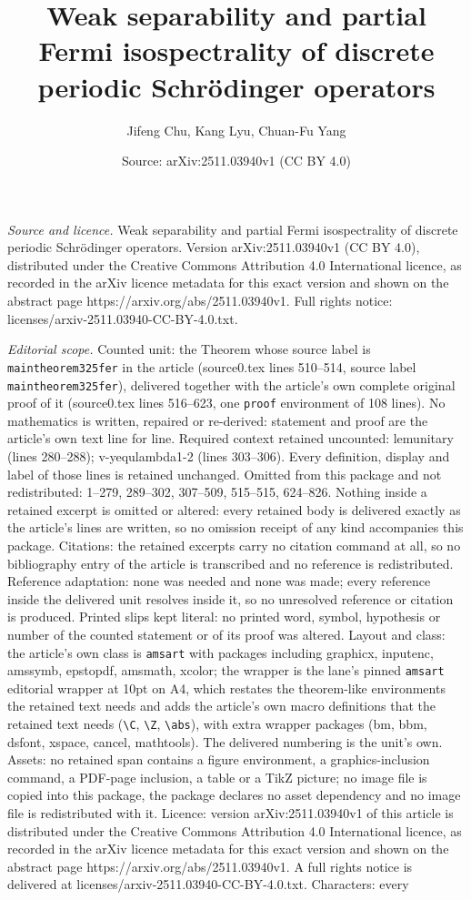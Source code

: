 \documentclass[10pt,a4paper]{amsart}
\title[Weak separability and partial Fermi isospectrality of discre]{Weak separability and partial Fermi isospectrality of discrete periodic Schr\"odinger operators}
\author{Jifeng Chu, Kang Lyu, Chuan-Fu Yang}
\date{Source: arXiv:2511.03940v1 (CC BY 4.0)}
\begin{document}
\maketitle

\noindent\emph{Source and licence.} Weak separability and partial Fermi isospectrality of discrete periodic Schr\"odinger operators. Version arXiv:2511.03940v1 (CC BY 4.0), distributed under the Creative Commons Attribution 4.0 International licence, as recorded in the arXiv licence metadata for this exact version and shown on the abstract page https://arxiv.org/abs/2511.03940v1. Full rights notice: licenses/arxiv-2511.03940-CC-BY-4.0.txt.\par\smallskip

\noindent\textit{Editorial scope.} Counted unit: the Theorem whose source label is \texttt{maintheorem325fer} in the article (source0.tex lines 510--514, source label \texttt{maintheorem325fer}), delivered together with the article's own complete original proof of it (source0.tex lines 516--623, one \texttt{proof} environment of 108 lines). No mathematics is written, repaired or re-derived: statement and proof are the article's own text line for line. Required context retained uncounted: lemunitary (lines 280--288); v-yequlambda1-2 (lines 303--306). Every definition, display and label of those lines is retained unchanged. Omitted from this package and not redistributed: 1--279, 289--302, 307--509, 515--515, 624--826. Nothing inside a retained excerpt is omitted or altered: every retained body is delivered exactly as the article's lines are written, so no omission receipt of any kind accompanies this package. Citations: the retained excerpts carry no citation command at all, so no bibliography entry of the article is transcribed and no reference is redistributed. Reference adaptation: none was needed and none was made; every reference inside the delivered unit resolves inside it, so no unresolved reference or citation is produced. Printed slips kept literal: no printed word, symbol, hypothesis or number of the counted statement or of its proof was altered. Layout and class: the article's own class is \texttt{amsart} with packages including graphicx, inputenc, amssymb, epstopdf, amsmath, xcolor; the wrapper is the lane's pinned \texttt{amsart} editorial wrapper at 10pt on A4, which restates the theorem-like environments the retained text needs and adds the article's own macro definitions that the retained text needs (\texttt{\textbackslash C}, \texttt{\textbackslash Z}, \texttt{\textbackslash abs}), with extra wrapper packages (bm, bbm, dsfont, xspace, cancel, mathtools). The delivered numbering is the unit's own. Assets: no retained span contains a figure environment, a graphics-inclusion command, a PDF-page inclusion, a table or a TikZ picture; no image file is copied into this package, the package declares no asset dependency and no image file is redistributed with it. Licence: version arXiv:2511.03940v1 of this article is distributed under the Creative Commons Attribution 4.0 International licence, as recorded in the arXiv licence metadata for this exact version and shown on the abstract page https://arxiv.org/abs/2511.03940v1. A full rights notice is delivered at licenses/arxiv-2511.03940-CC-BY-4.0.txt. Characters: every 
\end{document}
